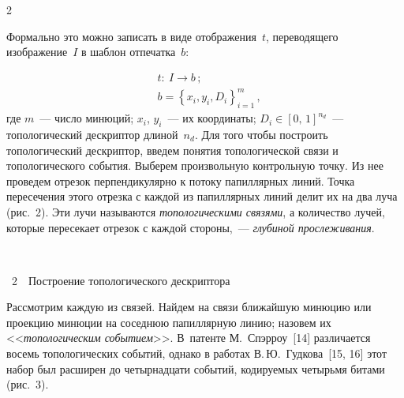 \begin{multicols}{2}
      
      Формально это можно записать в виде отображения~$t$, переводящего 
изображение~$I$ в шаблон отпечатка~$b$:

\noindent
      \begin{align*}
      &t:\ I\rightarrow b\,; %
      \\
      &b=\left\{ x_i,y_i,D_i\right\}^m_{i=1}\,, %
      \end{align*}
где $m$~--- число минюций; $x_i$, $y_i$~--- их координаты; $D_i\in [0,\,1]^{n_d}$~--- 
топологический дескриптор длиной~$n_d$. Для того чтобы построить топологический 
дескриптор, введем понятия топологической связи и топологического события. Выберем 
произвольную контрольную точку. Из нее проведем отрезок перпендикулярно к потоку 
папиллярных линий. Точка пересечения этого отрезка с каждой из папиллярных линий 
делит их на два луча (рис.~2). Эти лучи называются \textit{топологическими связями}, а 
количество лучей, которые пересекает отрезок с каждой стороны,~--- \textit{глубиной 
прослеживания}.

\begin{center} %
\vspace*{9pt}
\mbox{%
 \epsfxsize=76.744mm
}

\vspace*{9pt}
{{\figurename~2}\ \ \small{Построение топологического дескриптора}}
\end{center}

\vspace*{6pt}

\addtocounter{figure}{1}

      
      Рассмотрим каждую из связей. Найдем на связи ближайшую минюцию или 
проекцию минюции на соседнюю папиллярную линию; назовем их 
<<\textit{топологическим событием}>>. В~патенте М.~Спэрроу~[14] различается восемь 
топологических событий, однако в работах В.\,Ю.~Гудкова~[15, 16] этот набор был 
расширен до четырнадцати событий, кодируемых четырьмя битами (рис.~3).

\begin{figure} %
 \vspace*{1pt}
 \begin{center}
 \mbox{%
 \epsfxsize=153.389mm
 }
 \end{center}
 \vspace*{-9pt}
\vspace*{6pt}
\end{figure}
      


\end{multicols}
